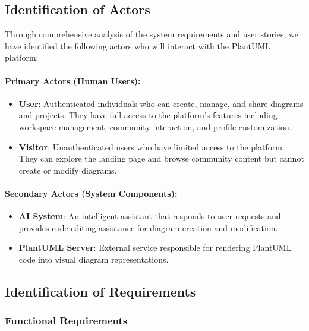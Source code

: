 \subsection{Identification of Actors}

Through comprehensive analysis of the system requirements and user stories, we have identified the following actors who will interact with the PlantUML platform:

\paragraph{Primary Actors (Human Users):}
\begin{itemize}
    \item \textbf{User}: Authenticated individuals who can create, manage, and share diagrams and projects. They have full access to the platform's features including workspace management, community interaction, and profile customization.
    
    \item \textbf{Visitor}: Unauthenticated users who have limited access to the platform. They can explore the landing page and browse community content but cannot create or modify diagrams.
    
\end{itemize}

\paragraph{Secondary Actors (System Components):}
\begin{itemize}
    \item \textbf{AI System}: An intelligent assistant that responds to user requests and provides code editing assistance for diagram creation and modification.
    
    \item \textbf{PlantUML Server}: External service responsible for rendering PlantUML code into visual diagram representations.
\end{itemize}

\subsection{Identification of Requirements}

\subsubsection{Functional Requirements}

